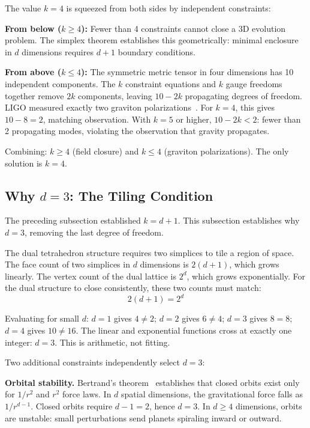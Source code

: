 \documentclass[aps,prd,preprint,superscriptaddress,showpacs,preprintnumbers,amsmath,amssymb,nofootinbib]{revtex4-2}
\begin{document}
The value $k = 4$ is squeezed from both sides by independent constraints:

\textbf{From below ($k \geq 4$):} Fewer than 4 constraints cannot close a 3D evolution problem. The simplex theorem establishes this geometrically: minimal enclosure in $d$ dimensions requires $d+1$ boundary conditions.

\textbf{From above ($k \leq 4$):} The symmetric metric tensor in four dimensions has 10 independent components. The $k$ constraint equations and $k$ gauge freedoms together remove $2k$ components, leaving $10 - 2k$ propagating degrees of freedom. LIGO measured exactly two graviton polarizations~\cite{gw170817}. For $k = 4$, this gives $10 - 8 = 2$, matching observation. With $k = 5$ or higher, $10 - 2k < 2$: fewer than 2 propagating modes, violating the observation that gravity propagates.

Combining: $k \geq 4$ (field closure) and $k \leq 4$ (graviton polarizations). The only solution is $k = 4$.

\subsection{Why $d = 3$: The Tiling Condition}
\label{subsec:d3}

The preceding subsection established $k = d + 1$. This subsection establishes why $d = 3$, removing the last degree of freedom.

The dual tetrahedron structure requires two simplices to tile a region of space. The face count of two simplices in $d$ dimensions is $2(d+1)$, which grows linearly. The vertex count of the dual lattice is $2^d$, which grows exponentially. For the dual structure to close consistently, these two counts must match:
\begin{equation}
2(d+1) = 2^d
\label{eq:tiling}
\end{equation}

Evaluating for small $d$: $d = 1$ gives $4 \neq 2$; $d = 2$ gives $6 \neq 4$; $d = 3$ gives $8 = 8$; $d = 4$ gives $10 \neq 16$. The linear and exponential functions cross at exactly one integer: $d = 3$. This is arithmetic, not fitting.

Two additional constraints independently select $d = 3$:

\textbf{Orbital stability.} Bertrand's theorem~\cite{goldstein2002} establishes that closed orbits exist only for $1/r^2$ and $r^2$ force laws. In $d$ spatial dimensions, the gravitational force falls as $1/r^{d-1}$. Closed orbits require $d - 1 = 2$, hence $d = 3$. In $d \geq 4$ dimensions, orbits are unstable: small perturbations send planets spiraling inward or outward.
\end{document}
